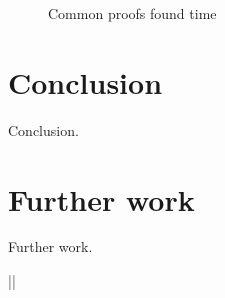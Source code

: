 \documentclass[english,version-2020-11]{uzl-thesis}
\begin{document}
\begin{itemize}
\begin{figure}[h!]
            \caption{Common proofs found time}
            \label{fig:time_common_proof}
          \end{figure}
      \end{itemize}

\chapter{Conclusion}

Conclusion.

\chapter{Further work}

Further work.




%











|$$|
\end{document}
